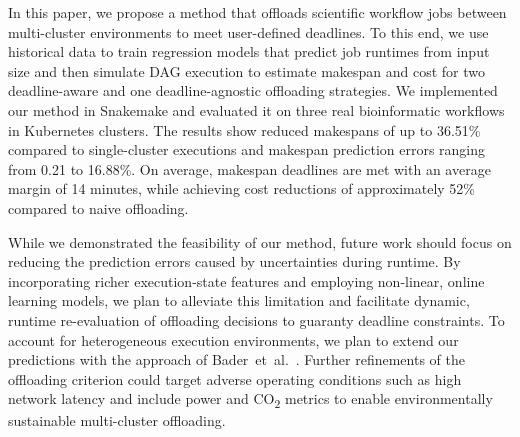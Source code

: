 In this paper, we propose a method that offloads scientific workflow jobs between multi-cluster environments to meet user-defined deadlines.
To this end, we use historical data to train regression models that predict job runtimes from input size and then simulate DAG execution to estimate makespan and cost for two deadline-aware and one deadline-agnostic offloading strategies.
We implemented our method in Snakemake and evaluated it on three real bioinformatic workflows in Kubernetes clusters. 
The results show reduced makespans of up to 36.51\% compared to single-cluster executions and makespan prediction errors ranging from 0.21 to 16.88\%. On average, makespan deadlines are met with an average margin of 14 minutes, while achieving cost reductions of approximately 52\% compared to naive offloading.

While we demonstrated the feasibility of our method, future work should focus on reducing the prediction errors caused by uncertainties during runtime.
By incorporating richer execution-state features and employing non-linear, online learning models, we plan to alleviate this limitation and facilitate dynamic, runtime re-evaluation of offloading decisions \cite{da_silva_online_2015, hilman_task_2018} to guaranty deadline constraints. 
To account for heterogeneous execution environments, we plan to extend our predictions with the approach of Bader~et~al.~\cite{bader_lotaru_2022, bader_lotaru_2024}. 
Further refinements of the offloading criterion could target adverse operating conditions such as high network latency and include power and CO\textsubscript{2} metrics to enable environmentally sustainable multi-cluster offloading.



